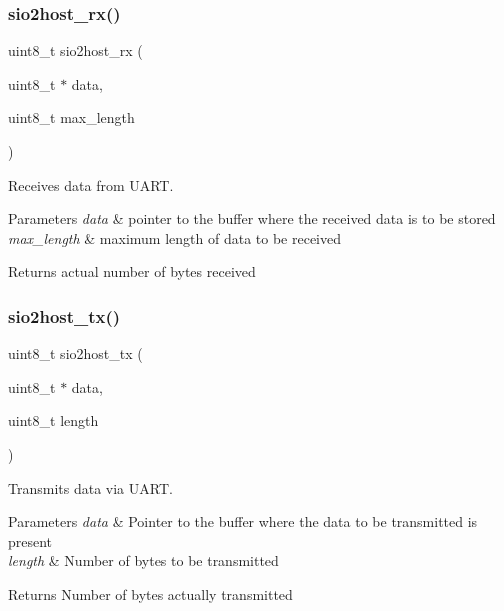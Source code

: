 \subsubsection{\texorpdfstring{sio2host\_rx()}{sio2host\_rx()}}
{\footnotesize\ttfamily uint8\+\_\+t sio2host\+\_\+rx (\begin{DoxyParamCaption}\item[{uint8\+\_\+t $\ast$}]{data,  }\item[{uint8\+\_\+t}]{max\+\_\+length }\end{DoxyParamCaption})}



Receives data from U\+A\+RT. 


\begin{DoxyParams}{Parameters}
{\em data} & pointer to the buffer where the received data is to be stored \\
\hline
{\em max\+\_\+length} & maximum length of data to be received\\
\hline
\end{DoxyParams}
\begin{DoxyReturn}{Returns}
actual number of bytes received 
\end{DoxyReturn}
\mbox{\label{group__group__sio2host__uart_gaf6c11e140f6115317c42db35a9262e0f}} 
\subsubsection{\texorpdfstring{sio2host\_tx()}{sio2host\_tx()}}
{\footnotesize\ttfamily uint8\+\_\+t sio2host\+\_\+tx (\begin{DoxyParamCaption}\item[{uint8\+\_\+t $\ast$}]{data,  }\item[{uint8\+\_\+t}]{length }\end{DoxyParamCaption})}



Transmits data via U\+A\+RT. 


\begin{DoxyParams}{Parameters}
{\em data} & Pointer to the buffer where the data to be transmitted is present \\
\hline
{\em length} & Number of bytes to be transmitted\\
\hline
\end{DoxyParams}
\begin{DoxyReturn}{Returns}
Number of bytes actually transmitted 
\end{DoxyReturn}
